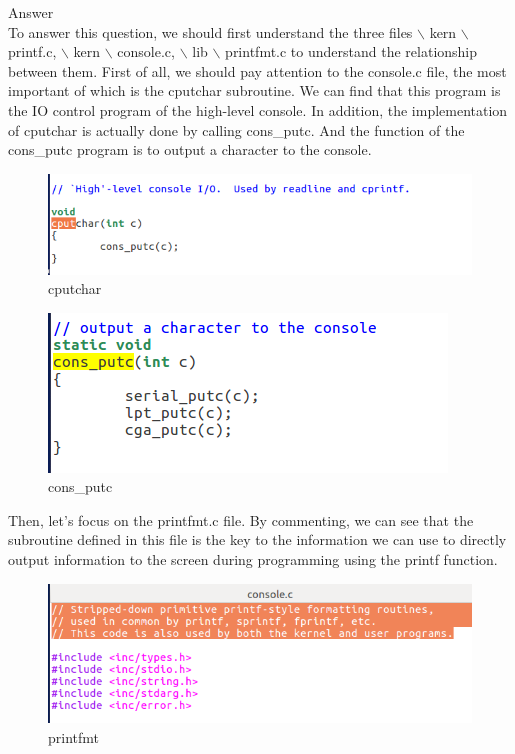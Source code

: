 \begin{flushleft}
{\Large Answer}\\
\qquad To answer this question, we should first understand the three files $\backslash$ kern $\backslash$  printf.c, $\backslash$ kern $\backslash $ console.c, $\backslash$ lib $\backslash$ printfmt.c to understand the relationship between them.
\qquad First of all, we should pay attention to the console.c file, the most important of which is the cputchar subroutine. We can find that this program is the IO control program of the high-level console. In addition, the implementation of cputchar is actually done by calling cons\_putc. And the function of the cons\_putc program is to output a character to the console.
\end{flushleft}
\begin{figure}[H]
  \centering
  \includegraphics[width=0.8\linewidth]{figure/cputchar}
  \caption{cputchar}\label{2}
\end{figure}
\begin{figure}[H]
  \centering
  \includegraphics[width=0.8\linewidth]{figure/cons_putc}
  \caption{cons\_putc}\label{2}
\end{figure}
\qquad Then, let's focus on the printfmt.c file. By commenting, we can see that the subroutine defined in this file is the key to the information we can use to directly output information to the screen during programming using the printf function.
\begin{figure}[H]
  \centering
  \includegraphics[width=0.8\linewidth]{figure/printfmt}
  \caption{printfmt}\label{2}
\end{figure}
